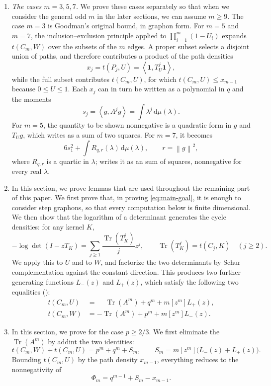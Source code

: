﻿\documentclass[11pt]{article}
\numberwithin{equation}{section}
\newcommand{\one}{\mathbf 1}
\newcommand{\ip}[2]{\left\langle #1,#2\right\rangle}
\newcommand{\norm}[1]{\left\lVert #1\right\rVert}
\newcommand{\Tr}{\operatorname{Tr}}
\newcommand{\dd}{\,\mathrm d}
\begin{document}
\begin{enumerate}[label=\textbf{Section \arabic*.},leftmargin=4.6em,start=2]
  \item \emph{The cases $m=3,5,7$.}
  We prove these cases separately so that when we consider the general odd $m$ in the later sections, we can assume $m\ge9$.
  The case $m=3$ is Goodman's original bound, in graphon form.
  For $m=5$ and $m=7$, the inclusion--exclusion principle applied to $\prod_{i=1}^m(1-U_i)$ expands $t(C_m,W)$ over the subsets of the $m$ edges.
  A proper subset selects a disjoint union of paths, and therefore contributes a product of the path densities
  \[
    x_j=t(P_j,U)=\ip\one{T_U^j\one},
  \]
  while the full subset contributes $t(C_m,U)$, for which $t(C_m,U)\le x_{m-1}$ because $0\le U\le1$.
  Each $x_j$ can in turn be written as a polynomial in $q$ and the moments
  \[
    s_j=\ip g{A^jg}=\int\lambda^j\dd\mu(\lambda).
  \]
  For $m=5$, the quantity to be shown nonnegative is a quadratic form in $g$ and $T_Ug$, which  writes as a sum of two squares.
  For $m=7$, it becomes
  \[
    6s_1^2+\int R_{q,r}(\lambda)\dd\mu(\lambda),
    \qquad r=\norm g^2,
  \]
  where $R_{q,r}$ is a quartic in $\lambda$;  writes it as an sum of squares, nonnegative for every real $\lambda$.

  \item In this section, we prove lemmas that are used throughout the remaining part of this paper.
  We first prove that, in proving \eqref{eq:main-goal}, it is enough to consider step graphons, so that every computation below is finite dimensional.
  We then show that the logarithm of a determinant generates the cycle densities: for any kernel $K$,
  \[
    -\log\det(I-zT_K)=\sum_{j\ge1}\frac{\Tr(T_K^j)}{j}z^j,
    \qquad
    \Tr(T_K^j)=t(C_j,K)\quad(j\ge2).
  \]
  We apply this to $U$ and to $W$, and factorize the two determinants by Schur complementation against the constant direction.
  This produces two further generating functions $L_-(z)$ and $L_+(z)$, which satisfy the following two equalities ():
  \begin{align*}
    t(C_m,U)&=\phantom{-}\Tr(A^m)+q^m+m[z^m]L_+(z),\\
    t(C_m,W)&=-\Tr(A^m)+p^m+m[z^m]L_-(z).
  \end{align*}
  \item In this section, we prove  for the case $p \ge 2/3$.
  We first eliminate the $\Tr(A^m)$ by addint the two identities:
  \[
    t(C_m,W)+t(C_m,U)=p^m+q^m+S_m,
    \qquad
    S_m=m[z^m]\bigl(L_-(z)+L_+(z)\bigr).
  \]
  Bounding $t(C_m,U)$ by the path density $x_{m-1}$, everything reduces to the nonnegativity of
  \[
    \Phi_m=q^{m-1}+S_m-x_{m-1}.
  \]


\end{enumerate}
\end{document}
